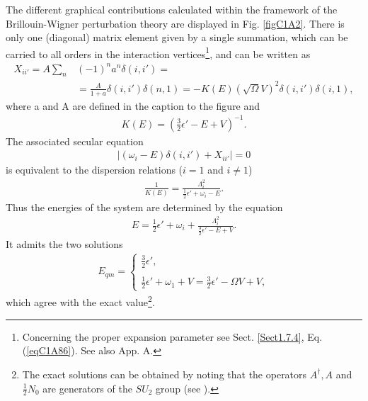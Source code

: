 The different graphical contributions calculated within the framework of the
Brillouin-Wigner perturbation theory are displayed in Fig. \ref{figC1A2}. There is only
one (diagonal) matrix element given by a single summation, which can be
carried to all orders in the interaction vertices\footnote{Concerning the proper expansion parameter see Sect. \ref{Sect1.7.4}, Eq. (\ref{eqC1A86}). See also \cite{Broglia:19d} App. A.}, and can be written as
 \begin{align}\label{eqC1A31} 
\nonumber X_{ii'}=A\sum_n&(-1)^na^n\delta(i,i')=\\
&=\frac{A}{1+a}\delta(i,i')\delta(n,1)=-K(E)(\sqrt{\Omega}V)^2\delta(i,i')\delta(i,1),
 \end{align}
where a and A are defined in the caption to the figure and
 \begin{align}\label{eqC1A32} 
K(E)=\left(\tfrac{3}{2}\epsilon'-E+V\right)^{-1}.
 \end{align}
The associated secular equation
 \begin{align}\label{eqC1A33} 
\left|(\omega_i-E)\delta(i,i')+X_{ii'}\right|=0
 \end{align}
is equivalent to the dispersion relations ($i=1$ and $i\neq1$)
 \begin{align}\label{eqC1A34} 
\frac{1}{K(E)}=\frac{\Lambda_i^2}{\frac{1}{2}\epsilon'+\omega_i-E}.
 \end{align}
Thus the energies of the system are determined by the equation
 \begin{align}\label{eqC1A35} 
E=\frac{1}{2}\epsilon'+\omega_i+\frac{\Lambda_i^2}{\tfrac{3}{2}\epsilon'-E+V}.
 \end{align}
It admits the two solutions
 \begin{align}\label{eqC1A36} 
E_{qm}=\left\{\begin{array}{l}
\frac{3}{2}\epsilon', \\ 
\\
\frac{1}{2}\epsilon'+\omega_1+V=\frac{3}{2}\epsilon'-\Omega V+V,
\end{array} 
\right.
 \end{align}
which agree with the exact value\footnote{The exact solutions can be  obtained  by noting that the operators $A^\dagger,A$ and $\frac{1}{2}N_0$ are generators of the $SU_2$ group (see \cite{Bortignon:77}).}.


